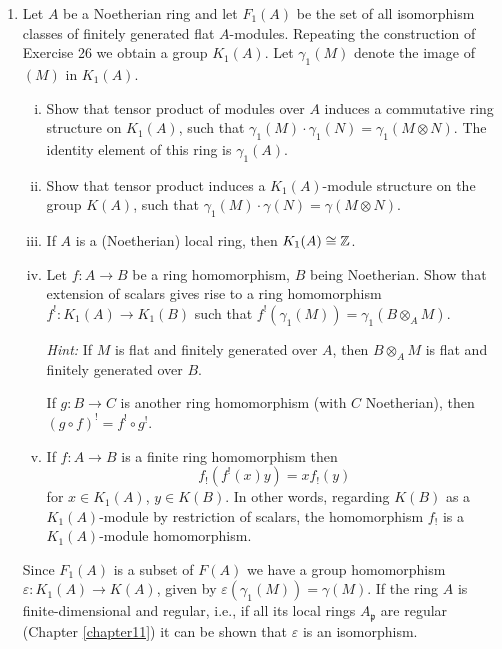 \begin{enumerate}
    \item \label{exer27-chapter7}Let $A$ be a Noetherian ring and let $F_1(A)$ be the set of all isomorphism classes of finitely generated flat $A$-modules. Repeating the construction of Exercise 26 we obtain a group $K_1(A)$. Let $\gamma_1(M)$ denote the image of $(M)$ in $K_1(A)$.
    \begin{enumerate}[i)]
        \item Show that tensor product of modules over $A$ induces a commutative ring structure on $K_1(A)$, such that $\gamma_1(M) \cdot \gamma_1(N) = \gamma_1(M \otimes N)$. The identity element of this ring is $\gamma_1(A)$.
        \item Show that tensor product induces a $K_1(A)$-module structure on the group $K(A)$, such that $\gamma_1(M) \cdot \gamma(N) = \gamma(M \otimes N)$.
        \item If $A$ is a (Noetherian) local ring, then $K_1(A) \cong \mathbb{Z}$.
        \item Let $f \colon A \to B$ be a ring homomorphism, $B$ being Noetherian. Show that extension of scalars gives rise to a ring homomorphism $f^! \colon K_1(A) \to K_1(B)$ such that $f^!(\gamma_1(M)) = \gamma_1(B \otimes_A M)$. 
        
        \textit{Hint:} If $M$ is flat and finitely generated over $A$, then $B \otimes_A M$ is flat and finitely generated over $B$.
        
        If $g \colon B \to C$ is another ring homomorphism (with $C$ Noetherian), then $(g \circ f)^! = f^! \circ g^!$.
        \item If $f \colon A \to B$ is a finite ring homomorphism then
        \[
            f_!(f^!(x)y) = x f_!(y)
        \]
        for $x \in K_1(A)$, $y \in K(B)$. In other words, regarding $K(B)$ as a $K_1(A)$-module by restriction of scalars, the homomorphism $f_!$ is a $K_1(A)$-module homomorphism.
    \end{enumerate}

    \begin{remark}
    Since $F_1(A)$ is a subset of $F(A)$ we have a group homomorphism $\varepsilon \colon K_1(A) \to K(A)$, given by $\varepsilon(\gamma_1(M)) = \gamma(M)$. If the ring $A$ is finite-dimensional and regular, i.e., if all its local rings $A_{\mathfrak{p}}$ are regular (Chapter \ref{chapter11}) it can be shown that $\varepsilon$ is an isomorphism.
    \end{remark}
\end{enumerate}

